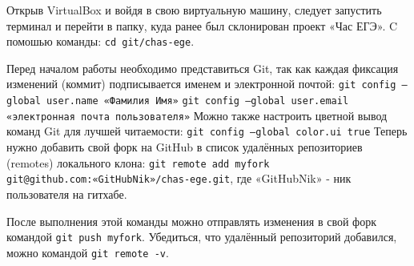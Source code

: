 Открыв VirtualBox и войдя в свою виртуальную машину, следует запустить терминал и перейти в папку, куда ранее был склонирован проект «Час ЕГЭ». C помошью команды: \texttt{cd git/chas-ege}.

Перед началом работы необходимо представиться Git, так как каждая фиксация изменений (коммит) подписывается именем и электронной почтой:
\newline \texttt{git config ---global user.name «Фамилия Имя»}
\newline \texttt{git config ---global user.email «электронная почта пользователя»}
\newline Можно также настроить цветной вывод команд Git для лучшей читаемости:
\texttt{git config ---global color.ui true}
\newline Теперь нужно добавить свой форк на GitHub в список удалённых репозиториев (remotes) локального клона:
\texttt{git remote add myfork git@github.com:«GitHubNik»/chas-ege.git}, где «GitHubNik» - ник пользователя на гитхабе. 

После выполнения этой команды можно отправлять изменения в свой форк командой \texttt{git push myfork}. Убедиться, что удалённый репозиторий добавился, можно командой \texttt{git remote -v}.

